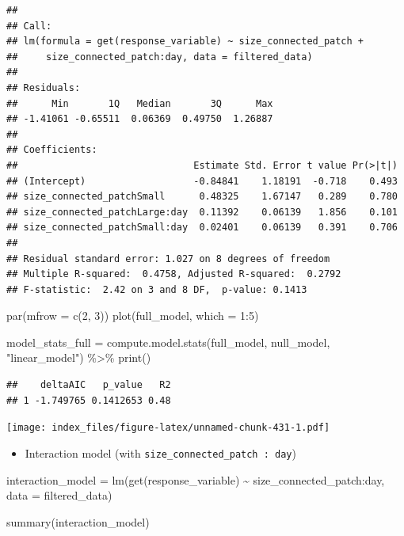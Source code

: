 \documentclass[
]{article}
\newenvironment{Shaded}{\begin{snugshade}}{\end{snugshade}}
\newcommand{\AttributeTok}[1]{\textcolor[rgb]{0.77,0.63,0.00}{#1}}
\newcommand{\DecValTok}[1]{\textcolor[rgb]{0.00,0.00,0.81}{#1}}
\newcommand{\FunctionTok}[1]{\textcolor[rgb]{0.00,0.00,0.00}{#1}}
\newcommand{\NormalTok}[1]{#1}
\newcommand{\OtherTok}[1]{\textcolor[rgb]{0.56,0.35,0.01}{#1}}
\newcommand{\SpecialCharTok}[1]{\textcolor[rgb]{0.00,0.00,0.00}{#1}}
\newcommand{\StringTok}[1]{\textcolor[rgb]{0.31,0.60,0.02}{#1}}
\providecommand{\tightlist}{%
  \setlength{\itemsep}{0pt}\setlength{\parskip}{0pt}}
\begin{document}
\begin{verbatim}
## 
## Call:
## lm(formula = get(response_variable) ~ size_connected_patch + 
##     size_connected_patch:day, data = filtered_data)
## 
## Residuals:
##      Min       1Q   Median       3Q      Max 
## -1.41061 -0.65511  0.06369  0.49750  1.26887 
## 
## Coefficients:
##                               Estimate Std. Error t value Pr(>|t|)
## (Intercept)                   -0.84841    1.18191  -0.718    0.493
## size_connected_patchSmall      0.48325    1.67147   0.289    0.780
## size_connected_patchLarge:day  0.11392    0.06139   1.856    0.101
## size_connected_patchSmall:day  0.02401    0.06139   0.391    0.706
## 
## Residual standard error: 1.027 on 8 degrees of freedom
## Multiple R-squared:  0.4758, Adjusted R-squared:  0.2792 
## F-statistic:  2.42 on 3 and 8 DF,  p-value: 0.1413
\end{verbatim}

\begin{Shaded}
\begin{Highlighting}[]
\FunctionTok{par}\NormalTok{(}\AttributeTok{mfrow =} \FunctionTok{c}\NormalTok{(}\DecValTok{2}\NormalTok{, }\DecValTok{3}\NormalTok{))}
\FunctionTok{plot}\NormalTok{(full\_model, }\AttributeTok{which =} \DecValTok{1}\SpecialCharTok{:}\DecValTok{5}\NormalTok{)}

\NormalTok{model\_stats\_full }\OtherTok{=} \FunctionTok{compute.model.stats}\NormalTok{(full\_model,}
\NormalTok{                                       null\_model,}
                                       \StringTok{"linear\_model"}\NormalTok{) }\SpecialCharTok{\%\textgreater{}\%}
  \FunctionTok{print}\NormalTok{()}
\end{Highlighting}
\end{Shaded}

\begin{verbatim}
##    deltaAIC   p_value   R2
## 1 -1.749765 0.1412653 0.48
\end{verbatim}

\texttt{[image: index\_files/figure-latex/unnamed-chunk-431-1.pdf]}

\begin{itemize}
\tightlist
\item
  Interaction model (with \texttt{size\_connected\_patch\ :\ day})
\end{itemize}

\begin{Shaded}
\begin{Highlighting}[]
\NormalTok{interaction\_model }\OtherTok{=} \FunctionTok{lm}\NormalTok{(}\FunctionTok{get}\NormalTok{(response\_variable) }\SpecialCharTok{\textasciitilde{}}
\NormalTok{                         size\_connected\_patch}\SpecialCharTok{:}\NormalTok{day,}
                       \AttributeTok{data =}\NormalTok{ filtered\_data)}

\FunctionTok{summary}\NormalTok{(interaction\_model)}
\end{Highlighting}
\end{Shaded}
\end{document}
